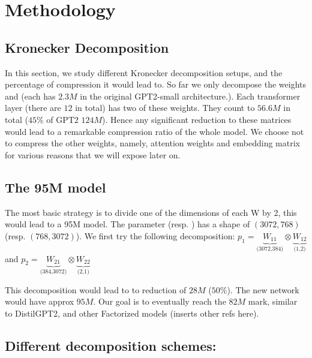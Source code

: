 \documentclass{article}
\begin{document}
\section{Methodology}%
\label{sec:Training setups}

\subsection{Kronecker Decomposition}%
\label{sub:Kronecker Decomposition}

In this section, we study different Kronecker decomposition setups, and the percentage of compression it would  lead to. So far we only decompose the weights  and  (each has $2.3M$ in the original GPT2-small architecture.). Each transformer layer (there are $12$ in total) has two of these weights. They count to $56.6M$ in total ($45\%$ of GPT2 $124M$). Hence any significant reduction to these matrices would lead to a remarkable compression ratio of the whole model. We choose not to compress the other weights, namely, attention weights and embedding matrix for various reasons that we will expose later on. 

\subsection{The 95M model}%
\label{sub:The 95M model}
The most basic strategy is to divide one of the dimensions of each W by 2, this would lead to a 95M model. The parameter  (resp. ) has a shape of $(3072, 768)$ (resp.  $(768, 3072)$). We first try the following decomposition: $p_1 = \underbrace{W_{11}}_{\text{(3072,384)}} \otimes \underbrace{W_{12}}_{\text{(1,2)}}$  and $p_2 = \underbrace{W_{21}}_{\text{(384,3072)}} \otimes \underbrace{W_{22}}_{\text{(2,1)}}$  


This decomposition would lead to to reduction of $28M$ ($50\%$). The new network would have approx $95M$. Our goal is to eventually reach the $82M$ mark, similar to DistilGPT2, and other Factorized models (inserts other refs here).

\subsection{Different decomposition schemes:}%
\label{sec:Different decomposition schemes}
\end{document}
